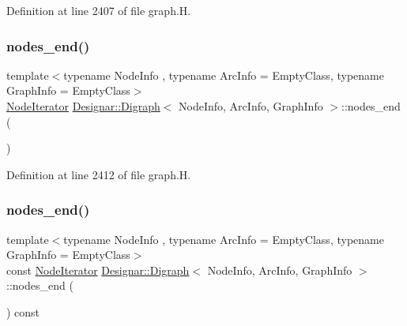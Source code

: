 Definition at line 2407 of file graph.\+H.

\mbox{\label{class_designar_1_1_digraph_a67917506d721e541955aa2a639b94759}} 
\subsubsection{\texorpdfstring{nodes\+\_\+end()}{nodes\_end()}\hspace{0.1cm}{\footnotesize\ttfamily [1/2]}}
{\footnotesize\ttfamily template$<$typename Node\+Info , typename Arc\+Info  = Empty\+Class, typename Graph\+Info  = Empty\+Class$>$ \\
\hyperlink{class_designar_1_1_digraph_1_1_node_iterator}{Node\+Iterator} \hyperlink{class_designar_1_1_digraph}{Designar\+::\+Digraph}$<$ Node\+Info, Arc\+Info, Graph\+Info $>$\+::nodes\+\_\+end (\begin{DoxyParamCaption}{ }\end{DoxyParamCaption})\hspace{0.3cm}{\ttfamily [inline]}}



Definition at line 2412 of file graph.\+H.

\mbox{\label{class_designar_1_1_digraph_a82c01284de2fc81c7bd04c13d8861d9a}} 
\subsubsection{\texorpdfstring{nodes\+\_\+end()}{nodes\_end()}\hspace{0.1cm}{\footnotesize\ttfamily [2/2]}}
{\footnotesize\ttfamily template$<$typename Node\+Info , typename Arc\+Info  = Empty\+Class, typename Graph\+Info  = Empty\+Class$>$ \\
const \hyperlink{class_designar_1_1_digraph_1_1_node_iterator}{Node\+Iterator} \hyperlink{class_designar_1_1_digraph}{Designar\+::\+Digraph}$<$ Node\+Info, Arc\+Info, Graph\+Info $>$\+::nodes\+\_\+end (\begin{DoxyParamCaption}{ }\end{DoxyParamCaption}) const\hspace{0.3cm}{\ttfamily [inline]}}



